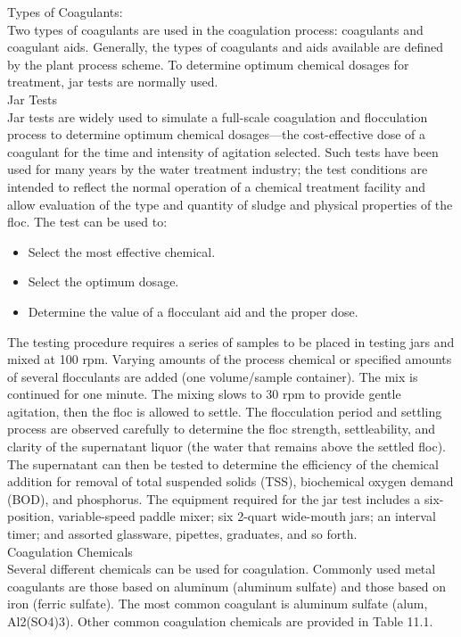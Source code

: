 \documentclass{article}
\begin{document}
Types of Coagulants:\\
Two types of coagulants are used in the coagulation process: coagulants and coagulant aids. Generally, the types of coagulants and aids available are defined by the plant process scheme. To determine optimum chemical dosages for treatment, jar tests are normally used.\\
Jar Tests\\
Jar tests are widely used to simulate a full-scale coagulation and flocculation process to determine optimum chemical dosages—the cost-effective dose of a coagulant for the time and intensity of agitation selected. Such tests have been used for many years by the water treatment industry; the test conditions are intended to reflect the normal operation of a chemical treatment facility and allow evaluation of the type and quantity of sludge and physical properties of the floc. The test can be used to:\\
\begin{itemize}
\item Select the most effective chemical.
\item Select the optimum dosage.
\item Determine the value of a flocculant aid and the proper dose.
\end{itemize}
The testing procedure requires a series of samples to be placed in testing jars and mixed at 100 rpm. Varying amounts of the process chemical or specified amounts of several flocculants are added (one volume/sample container). The mix is continued
for one minute. The mixing slows to 30 rpm to provide gentle agitation, then the floc is allowed to settle. The flocculation period and settling process are observed carefully to determine the floc strength, settleability, and clarity of the supernatant liquor (the water that remains above the settled floc). The supernatant can then be tested to determine the efficiency of the chemical addition for removal of total suspended solids (TSS), biochemical oxygen demand (BOD), and phosphorus. The equipment required for the jar test includes a six-position, variable-speed paddle mixer; six 2-quart wide-mouth jars; an interval timer; and assorted glassware, pipettes, graduates, and so forth.\\

Coagulation Chemicals\\
Several different chemicals can be used for coagulation. Commonly used metal coagulants are those based on aluminum (aluminum sulfate) and those based on iron (ferric sulfate). The most common coagulant is aluminum sulfate (alum, Al2(SO4)3). Other common coagulation chemicals are provided in Table 11.1.\\
\end{document}
